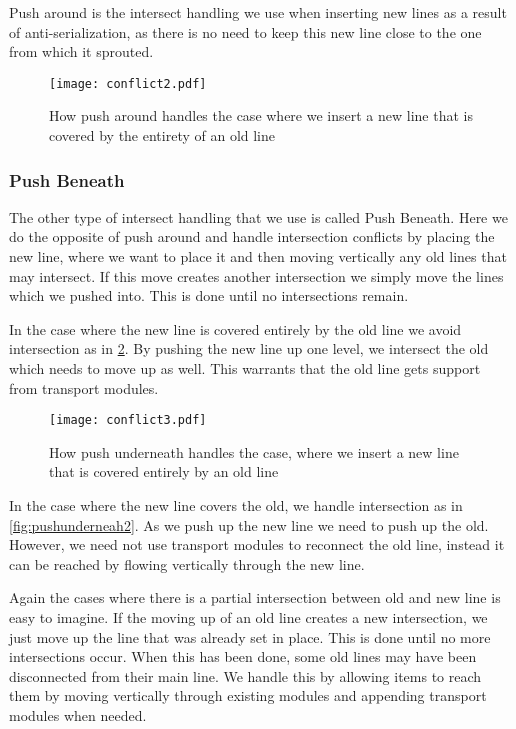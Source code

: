 Push around is the intersect handling we use when inserting new lines as a result of anti-serialization, as there is no need to keep this new line close to the one from which it sprouted. 

\begin{figure}[h]
\centering
\texttt{[image: conflict2.pdf]}
\caption{How push around handles the case where we insert a new line that is covered by the entirety of an old line}
\label{fig:pusharound2}
\end{figure}

\subsubsection{Push Beneath}
The other type of intersect handling that we use is called Push Beneath. Here we do the opposite of push around and handle intersection conflicts by placing the new line, where we want to place it and then moving vertically any old lines that may intersect. If this move creates another intersection we simply move the lines which we pushed into. This is done until no intersections remain. 

In the case where the new line is covered entirely by the old line we avoid intersection as in \cref{fig:pushunderneath1}. By pushing the new line up one level, we intersect the old which needs to move up as well. This warrants that the old line gets support from transport modules.

\begin{figure}[h]
\centering
\texttt{[image: conflict3.pdf]}
\caption{How push underneath handles the case, where we insert a new line that is covered entirely by an old line}
\label{fig:pushunderneath1}
\end{figure}

In the case where the new line covers the old, we handle intersection as in \cref{fig:pushunderneah2}. As we push up the new line we need to push up the old. However, we need not use transport modules to reconnect the old line, instead it can be reached by flowing vertically through the new line.

Again the cases where there is a partial intersection between old and new line is easy to imagine. If the moving up of an old line creates a new intersection, we just move up the line that was already set in place. This is done until no more intersections occur. When this has been done, some old lines may have been disconnected from their main line. We handle this by allowing items to reach them by moving vertically through existing modules and appending transport modules when needed.  

